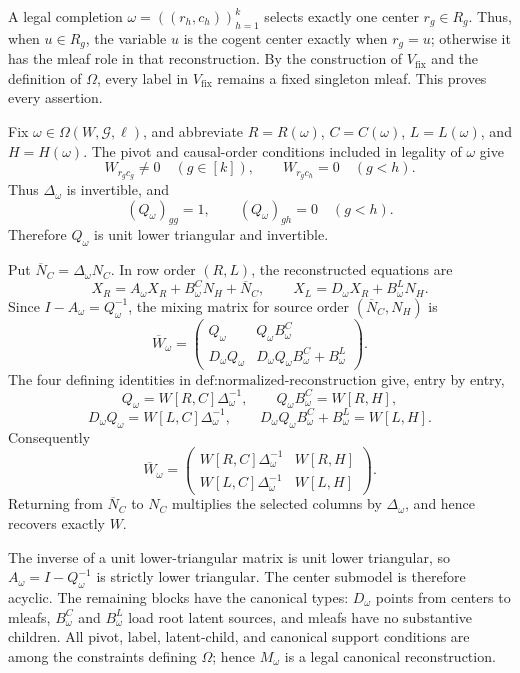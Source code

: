 A legal completion \(\omega=((r_h,c_h))_{h=1}^k\) selects exactly one center \(r_g\in R_g\).  Thus, when \(u\in R_g\), the variable \(u\) is the cogent center exactly when \(r_g=u\); otherwise it has the mleaf role in that reconstruction.  By the construction of \(V_{\mathrm{fix}}\) and the definition of \(\Omega\), every label in \(V_{\mathrm{fix}}\) remains a fixed singleton mleaf.  This proves every assertion.

Fix \(\omega\in\Omega(W,\mathcal G,\ell)\), and abbreviate \(R=R(\omega)\), \(C=C(\omega)\), \(L=L(\omega)\), and \(H=H(\omega)\).  The pivot and causal-order conditions included in legality of \(\omega\) give
\[
W_{r_gc_g}\ne0\quad(g\in[k]),
\qquad
W_{r_gc_h}=0\quad(g<h).
\]
Thus \(\Delta_\omega\) is invertible, and
\[
(Q_\omega)_{gg}=1,
\qquad
(Q_\omega)_{gh}=0\quad(g<h).
\]
Therefore \(Q_\omega\) is unit lower triangular and invertible.

Put \(\overline N_C=\Delta_\omega N_C\).  In row order \((R,L)\), the reconstructed equations are
\[
X_R=A_\omega X_R+B^C_\omega N_H+\overline N_C,
\qquad
X_L=D_\omega X_R+B^L_\omega N_H.
\]
Since \(I-A_\omega=Q_\omega^{-1}\), the mixing matrix for source order \((\overline N_C,N_H)\) is
\[
\overline W_\omega=
\begin{pmatrix}
Q_\omega&Q_\omega B^C_\omega\\
D_\omega Q_\omega&D_\omega Q_\omega B^C_\omega+B^L_\omega
\end{pmatrix}.
\]
The four defining identities in \(\text{def:normalized-reconstruction}\) give, entry by entry,
\[
Q_\omega=W[R,C]\Delta_\omega^{-1},
\qquad
Q_\omega B^C_\omega=W[R,H],
\]
\[
D_\omega Q_\omega=W[L,C]\Delta_\omega^{-1},
\qquad
D_\omega Q_\omega B^C_\omega+B^L_\omega=W[L,H].
\]
Consequently
\[
\overline W_\omega=
\begin{pmatrix}
W[R,C]\Delta_\omega^{-1}&W[R,H]\\
W[L,C]\Delta_\omega^{-1}&W[L,H]
\end{pmatrix}.
\]
Returning from \(\overline N_C\) to \(N_C\) multiplies the selected columns by \(\Delta_\omega\), and hence recovers exactly \(W\).

The inverse of a unit lower-triangular matrix is unit lower triangular, so \(A_\omega=I-Q_\omega^{-1}\) is strictly lower triangular.  The center submodel is therefore acyclic.  The remaining blocks have the canonical types: \(D_\omega\) points from centers to mleafs, \(B^C_\omega\) and \(B^L_\omega\) load root latent sources, and mleafs have no substantive children.  All pivot, label, latent-child, and canonical support conditions are among the constraints defining \(\Omega\); hence \(M_\omega\) is a legal canonical reconstruction.

